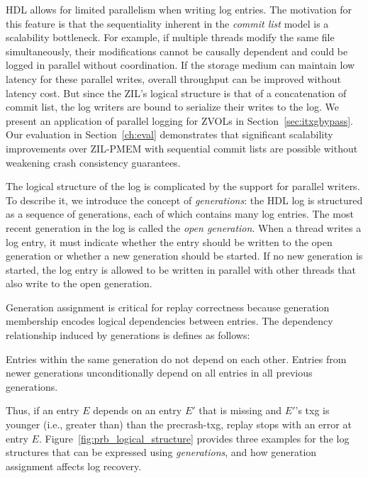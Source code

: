 \documentclass[12pt,a4paper,twoside]{book}
\begin{document}
HDL allows for limited parallelism when writing log entries.
The motivation for this feature is that the sequentiality inherent in the \textit{commit list} model is a scalability bottleneck.
For example, if multiple threads modify the same file simultaneously, their modifications cannot be causally dependent and could be logged in parallel without coordination.
If the storage medium can maintain low latency for these parallel writes, overall throughput can be improved without latency cost.
But since the ZIL's logical structure is that of a concatenation of commit list, the log writers are bound to serialize their writes to the log.
We present an application of parallel logging for ZVOLs in Section~\ref{sec:itxgbypass}.
Our evaluation in Section~\ref{ch:eval} demonstrates that significant scalability improvements over ZIL-PMEM with sequential commit lists are possible without weakening crash consistency guarantees.

The logical structure of the log is complicated by the support for parallel writers.
To describe it, we introduce the concept of \textit{generations}:
the HDL log is structured as a sequence of generations, each of which contains many log entries.
The most recent generation in the log is called the \textit{open generation}.
When a thread writes a log entry, it must indicate whether the entry should be written to the open generation or whether a new generation should be started.
If no new generation is started, the log entry is allowed to be written in parallel with other threads that also write to the open generation.

Generation assignment is critical for replay correctness because generation membership encodes logical dependencies between entries.
The dependency relationship induced by generations is defines as follows:
\begin{displayquote}
Entries within the same generation do not depend on each other.
Entries from newer generations unconditionally depend on all entries in all previous generations.
\end{displayquote}
Thus, if an entry $E$ depends on an entry $E'$ that is missing and $E'$'s txg is younger (i.e., greater than) than the precrash-txg, replay stops with an error at entry $E$.
Figure~\ref{fig:prb_logical_structure} provides three examples for the log structures that can be expressed using \textit{generations}, and how generation assignment affects log recovery.
\end{document}
